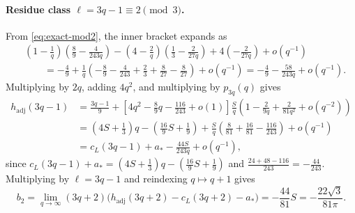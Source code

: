 \documentclass[11pt,a4paper]{article}
\numberwithin{equation}{section}
\theoremstyle{plain}
\theoremstyle{definition}
\theoremstyle{remark}
\newcommand{\hadj}{h_{\mathrm{adj}}}
\begin{document}
\paragraph{Residue class $\ell = 3q-1 \equiv 2 \pmod 3$.}
From \eqref{eq:exact-mod2}, the inner bracket expands as
\begin{align*}
  &\left(1-\frac{1}{q}\right)\left(\frac{8}{9}-\frac{4}{243q}\right)
  - \left(4-\frac{2}{q}\right)\left(\frac{1}{3}-\frac{2}{27q}\right)
  + 4\left(-\frac{2}{27q}\right) + o(q^{-1})\\
  &\qquad = -\frac{4}{9} + \frac{1}{q}\left(-\frac{8}{9}-\frac{4}{243}+\frac{2}{3}+\frac{8}{27}-\frac{8}{27}\right) + o(q^{-1})
   = -\frac{4}{9} - \frac{58}{243q} + o(q^{-1}).
\end{align*}
Multiplying by $2q$, adding $4q^2$, and multiplying by $p_{3q}(q)$ gives
\begin{align*}
  \hadj(3q-1)
  &= \frac{3q-1}{9}
   + \left[4q^2 - \frac{8}{9}q - \frac{116}{243} + o(1)\right]
     \frac{S}{q}\left(1 - \frac{2}{9q} + \frac{2}{81q^2} + o(q^{-2})\right)\\
  &= \left(4S+\frac{1}{3}\right)q - \left(\frac{16}{9}S + \frac{1}{9}\right)
   + \frac{S}{q}\left(\frac{8}{81} + \frac{16}{81} - \frac{116}{243}\right) + o(q^{-1})\\
  &= c_L(3q-1) + a_* - \frac{44S}{243q} + o(q^{-1}),
\end{align*}
since $c_L(3q-1)+a_* = (4S+\frac{1}{3})q - (\frac{16}{9}S+\frac{1}{9})$ and $\frac{24+48-116}{243} = -\frac{44}{243}$. Multiplying by $\ell=3q-1$ and reindexing $q\mapsto q+1$ gives
\[
  b_2 = \lim_{q\to\infty}(3q+2)\bigl(\hadj(3q+2) - c_L(3q+2) - a_*\bigr)
      = -\frac{44}{81}S = -\frac{22\sqrt{3}}{81\pi}.
\]
\end{document}
